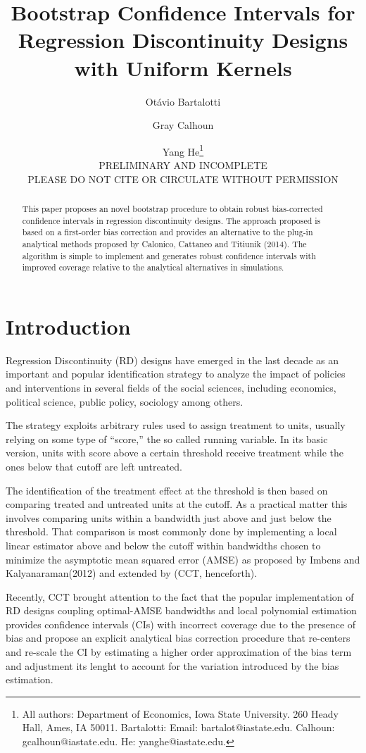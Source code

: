 \documentclass[12pt,fleqn]{article}
\title{Bootstrap Confidence Intervals for Regression Discontinuity Designs with Uniform Kernels}
\author{Ot\'avio Bartalotti \and Gray Calhoun \and Yang He\thanks{All authors: 
Department of Economics, Iowa State University. 260 Heady Hall, Ames, IA  50011.
Bartalotti: Email: bartalot@iastate.edu. Calhoun: gcalhoun@iastate.edu.
He: yanghe@iastate.edu.} \\ PRELIMINARY AND INCOMPLETE \\PLEASE DO NOT CITE OR CIRCULATE WITHOUT PERMISSION}
\begin{document}
\maketitle

\begin{abstract}
This paper proposes an novel bootstrap procedure to obtain robust bias-corrected
confidence intervals in regression discontinuity designs. The approach proposed 
is based on a first-order bias correction and provides an alternative
to the plug-in analytical methods proposed by Calonico, Cattaneo and Titiunik (2014).
The algorithm is simple to implement and generates robust confidence intervals
with improved coverage relative to the analytical alternatives in simulations.
\end{abstract}

\section{Introduction}
Regression Discontinuity (RD) designs have emerged in the last decade as an 
important and popular identification strategy to analyze the impact of policies
and interventions in several fields of the social sciences, including economics,
political science, public policy, sociology among others.

The strategy exploits arbitrary rules used to assign treatment to units, usually
relying on some type of ``score,'' the so called running variable. In its basic 
version, units with score above a certain threshold receive treatment while the 
ones below that cutoff are left untreated.

The identification of the treatment effect at the threshold is then based on 
comparing treated and untreated units at the cutoff. As a practical matter this 
involves comparing units within a bandwidth just above and just below the 
threshold. That comparison is most commonly done by implementing a local linear
estimator above and below the cutoff within bandwidths chosen to minimize the 
asymptotic mean squared error (AMSE) as proposed by Imbens and Kalyanaraman(2012)
and extended by \cite{calonico2014} (CCT, henceforth).

Recently, CCT brought attention to the fact that the popular implementation of RD designs coupling optimal-AMSE bandwidths
and local polynomial estimation provides confidence intervals (CIs) with
incorrect coverage due to the presence of bias and propose an explicit analytical
bias correction procedure that re-centers and re-scale the CI by estimating a higher 
order approximation of the bias term and adjustment its lenght to account for 
the variation introduced by the bias estimation.
\end{document}
